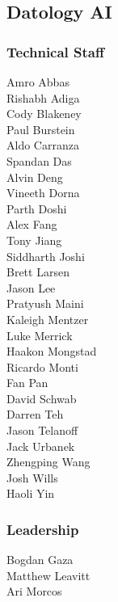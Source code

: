 \documentclass{article}
\begin{document}
\subsection*{Datology AI}
\subsubsection*{Technical Staff}
Amro Abbas\\
Rishabh Adiga\\
Cody Blakeney\\
Paul Burstein\\
Aldo Carranza\\
Spandan Das\\
Alvin Deng\\
Vineeth Dorna\\
Parth Doshi\\
Alex Fang\\
Tony Jiang\\
Siddharth Joshi\\
Brett Larsen\\
Jason Lee\\
Pratyush Maini\\
Kaleigh Mentzer\\
Luke Merrick\\
Haakon Mongstad\\
Ricardo Monti\\
Fan Pan\\
David Schwab\\
Darren Teh\\
Jason Telanoff\\
Jack Urbanek\\
Zhengping Wang\\
Josh Wills\\
Haoli Yin

\subsubsection*{Leadership}
Bogdan Gaza\\
Matthew Leavitt\\
Ari Morcos

\newpage


\end{document}
